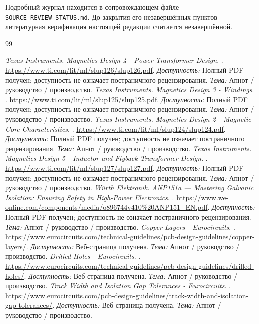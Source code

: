 \documentclass[14pt,a4paper]{extarticle}
\begin{document}
Подробный журнал находится в сопровождающем файле \nolinkurl{SOURCE_REVIEW_STATUS.md}. До закрытия его незавершённых пунктов литературная верификация настоящей редакции считается незавершённой.

\begin{thebibliography}{99}
\small\raggedright
{}
\textit{Texas Instruments. Magnetics Design 4 - Power Transformer Design}. .
\url{https://www.ti.com/lit/ml/slup126/slup126.pdf}.
\textit{Доступность:} Полный PDF получен; доступность не означает постраничного рецензирования. \textit{Тема:} Апнот / руководство / производство.
\textit{Texas Instruments. Magnetics Design 3 - Windings}. .
\url{https://www.ti.com/lit/ml/slup125/slup125.pdf}.
\textit{Доступность:} Полный PDF получен; доступность не означает постраничного рецензирования. \textit{Тема:} Апнот / руководство / производство.
\textit{Texas Instruments. Magnetics Design 2 - Magnetic Core Characteristics}. .
\url{https://www.ti.com/lit/ml/slup124/slup124.pdf}.
\textit{Доступность:} Полный PDF получен; доступность не означает постраничного рецензирования. \textit{Тема:} Апнот / руководство / производство.
\textit{Texas Instruments. Magnetics Design 5 - Inductor and Flyback Transformer Design}. .
\url{https://www.ti.com/lit/ml/slup127/slup127.pdf}.
\textit{Доступность:} Полный PDF получен; доступность не означает постраничного рецензирования. \textit{Тема:} Апнот / руководство / производство.
\textit{Würth Elektronik. ANP151a — Mastering Galvanic Isolation: Ensuring Safety in High-Power Electronics}. .
\url{https://www.we-online.com/components/media/o896744v410%20ANP151_EN.pdf}.
\textit{Доступность:} Полный PDF получен; доступность не означает постраничного рецензирования. \textit{Тема:} Апнот / руководство / производство.
\textit{Copper Layers - Eurocircuits}. .
\url{https://www.eurocircuits.com/technical-guidelines/pcb-design-guidelines/copper-layers/}.
\textit{Доступность:} Веб-страница получена. \textit{Тема:} Апнот / руководство / производство.
\textit{Drilled Holes - Eurocircuits}. .
\url{https://www.eurocircuits.com/technical-guidelines/pcb-design-guidelines/drilled-holes/}.
\textit{Доступность:} Веб-страница получена. \textit{Тема:} Апнот / руководство / производство.
\textit{Track Width and Isolation Gap Tolerances - Eurocircuits}. .
\url{https://www.eurocircuits.com/pcb-design-guidelines/track-width-and-isolation-gap-tolerances/}.
\textit{Доступность:} Веб-страница получена. \textit{Тема:} Апнот / руководство / производство.

\end{thebibliography}
\end{document}
